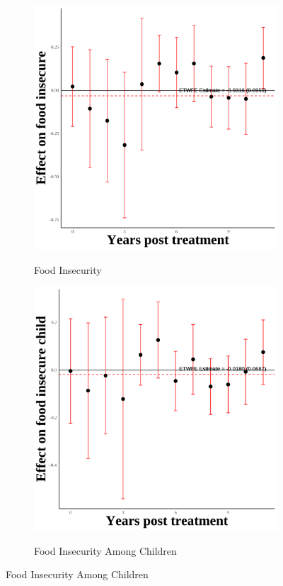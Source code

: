 \documentclass[12pt,english]{article}
\begin{document}
\begin{figure}[H]
  \begin{subfigure}[b]{0.3\textwidth}
    \centering
    \caption{Food Insecurity}
    \includegraphics[width=\linewidth]{figures/plot79-food_insecure_event_study-third-three.png}
    \label{fig:food-insecure-third-three}
  \end{subfigure}
  \hfill
  \begin{subfigure}[b]{0.3\textwidth}
    \centering
    \caption{Food Insecurity Among Children}
    \includegraphics[width=\linewidth]{figures/plot80-food_insecure_child_event_study-third-three.png}
    \label{fig:food-insecure-child-third-three}
  \end{subfigure}

\end{figure}
\end{document}

